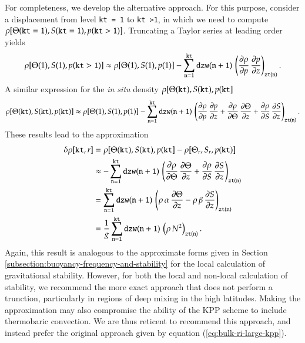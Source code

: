 For completeness, we develop the alternative approach.  For this
purpose, consider a displacement from level {\tt kt = 1} to {\tt kt
  >1}, in which we need to compute $\rho[\Theta({\tt kt=1}),S({\tt
  kt=1}),p({\tt kt>1})]$.  Truncating a Taylor series at leading order
yields
\begin{equation}
 \rho[\Theta(1),S(1),p({\tt kt>1})]
 \approx 
 \rho[\Theta(1),S(1),p(1)] 
 - \sum\limits_{{\tt n  = 1}}^{{\tt kt}}
   {\tt dzw(n+1)} \,  \left( \frac{\partial \rho}{\partial p} \, \frac{\partial p}{\partial z}
   \right)_{ {\tt zt(n)} }.
\end{equation}
A similar expression for the {\it in situ} density $\rho[\Theta({\tt
  kt}), S({\tt kt}), p({\tt kt} ]$
\begin{equation}
 \rho[\Theta({\tt kt}),S({\tt kt}),p({\tt kt})]
 \approx 
 \rho[\Theta(1),S(1),p(1)] 
 - \sum\limits_{{\tt n  = 1}}^{{\tt kt}}
   {\tt dzw(n+1)} \,  \left( 
   \frac{\partial \rho}{\partial p} \, \frac{\partial p}{\partial z}
   + 
  \frac{\partial \rho}{\partial \Theta} \, \frac{\partial \Theta}{\partial z}
  +
  \frac{\partial \rho}{\partial S} \, \frac{\partial S}{\partial z}
   \right)_{ {\tt zt(n)} }.
\end{equation}
These results lead to the approximation 
\begin{subequations}
\begin{align}
 \delta\rho[{\tt kt},r]  &= \rho[\Theta({\tt kt}), S({\tt kt}), p({\tt kt} ]  -\rho[\Theta_{r}, S_{r}, p({\tt kt})]
 \\
 &\approx 
 -\sum\limits_{{\tt n  = 1}}^{{\tt kt}}
   {\tt dzw(n+1)} \,  \left( 
 \frac{\partial \rho}{\partial \Theta} \, \frac{\partial \Theta}{\partial z}
  +
  \frac{\partial \rho}{\partial S} \, \frac{\partial S}{\partial z}
   \right)_{ {\tt zt(n)} }
\\
 &=
 \sum\limits_{{\tt n  = 1}}^{{\tt kt}}
   {\tt dzw(n+1)} \,  \left( 
 \rho \, \alpha \, \frac{\partial \Theta}{\partial z}
  -
  \rho \, \beta \, \frac{\partial S}{\partial z}
   \right)_{ {\tt zt(n)} }
\\
 &= 
 \frac{1}{g} 
  \sum\limits_{{\tt n  = 1}}^{{\tt kt}}
   {\tt dzw(n+1)} \,  \left( \rho \, N^{2} \right)_{ {\tt zt(n)} }.
\end{align}
\label{eq:summed-n2-for-nonlocal-stability}
\end{subequations}
Again, this result is analogous to the approximate forms given in
Section \ref{subsection:buoyancy-frequency-and-stability} for the
local calculation of gravitational stability.  However, for both the
local and non-local calculation of stability, we recommend the more
exact approach that does not perform a trunction, particularly in
regions of deep mixing in the high latitudes. Making the approximation
may also compromise the ability of the KPP scheme to include
thermobaric convection.  We are thus reticent to recommend this
approach, and instead prefer the original approach given by equation
(\ref{eq:bulk-ri-large-kpp}).


